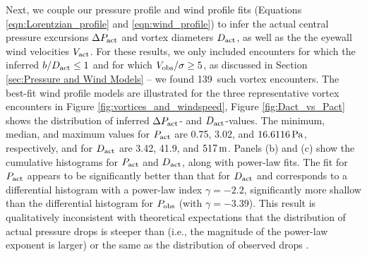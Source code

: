 \documentclass{aastex63}
\newcommand{\boverDactltone}{139}
\begin{document}

Next, we couple our pressure profile and wind profile fits (Equations \ref{eqn:Lorentzian_profile} and \ref{eqn:wind_profile}) to infer the actual central pressure excursions $\Delta P_{\rm act}$ and vortex diameters $D_{\rm act}$, as well as the the eyewall wind velocities $V_{\rm act}$. For these results, we only included encounters for which the inferred $b/D_{\rm act} \leq 1$ and for which $V_{\rm obs}/\sigma \geq 5$, as discussed in Section \ref{sec:Pressure and Wind Models} -- we found \boverDactltone\ such vortex encounters. The best-fit wind profile models are illustrated for the three representative vortex encounters in Figure \ref{fig:vortices_and_windspeed}, Figure \ref{fig:Dact_vs_Pact} shows the distribution of inferred $\Delta P_{\rm act}$- and $D_{\rm act}$-values. The minimum, median, and maximum values for $P_{\rm act}$ are 0.75, 3.02, and $16.6116\,{\rm Pa}$, respectively, and for $D_{\rm act}$ are 3.42, 41.9, and $517\,{\rm m}$. Panels (b) and (c) show the cumulative histograms for $P_{\rm act}$ and $D_{\rm act}$, along with power-law fits. The fit for $P_{\rm act}$ appears to be significantly better than that for $D_{\rm act}$ and corresponds to a differential histogram with a power-law index $\gamma = -2.2$, significantly more shallow than the differential histogram for $P_{\rm obs}$ (with $\gamma = -3.39$). This result is qualitatively inconsistent with theoretical expectations that the distribution of actual pressure drops is steeper than (i.e., the magnitude of the power-law exponent is larger) or the same as the distribution of observed drops \citep{2014JAtS...71.4461L, 2018Icar..299..166J, 2019Icar..317..209K}.
\end{document}
